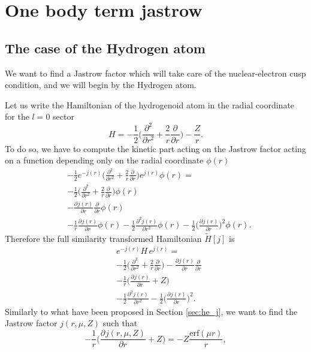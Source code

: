 \documentclass[aip,jcp,reprint,noshowkeys,superscriptaddress]{revtex4-1}
\newcommand{\deriv}[3]{\frac{\partial^{#3} #1}{\partial {#2}^{#3}}}
\begin{document}
\section{One body term jastrow}
\subsection{The case of the Hydrogen atom}
We want to find a Jastrow factor which will take care of the nuclear-electron cusp condition, and we will begin by the Hydrogen atom.  

Let us write the Hamiltonian of the hydrogenoid atom in the radial coordinate for the $l=0$ sector 
\begin{equation}
 H = -\frac{1}{2} \big( \deriv{}{r}{2} + \frac{2}{r} \deriv{}{r}{}\big) - \frac{Z}{r}.
\end{equation}
To do so, we have to compute the kinetic part acting on the Jastrow factor acting on a function depending only on the radial coordinate $\phi( r)$
\begin{equation}
 \label{eq:h_atom_j}
 \begin{aligned}
 & -\frac{1}{2}e^{-j(r)}\big(\deriv{}{r}{2} + \frac{2}{r} \deriv{}{r}{} \big) e^{j(r)}\phi(r)  = \\
 & -\frac{1}{2}\big( \deriv{}{r}{2} + \frac{2}{r} \deriv{}{r}{} \big) \phi(r) \\
 &-\deriv{j(r)}{r}{}\deriv{}{r}{}\phi(r) \\
 &-\frac{1}{r}\deriv{j(r)}{r}{}\phi(r)  - \frac{1}{2}\deriv{j(r)}{r}{2}\phi(r)  -  \frac{1}{2}\bigg(\deriv{j(r)}{r}{} \bigg)^2 \phi(r).
 \end{aligned}
\end{equation}
Therefore the full similarity transformed Hamiltonian $\tilde{H}[j]$ is 
\begin{equation}
 \begin{aligned}
 \label{eq:one_e_0}
 & e^{-j(r)}H\,e^{j(r)} = \\
 & -\frac{1}{2}\big( \deriv{}{r}{2} + \frac{2}{r} \deriv{}{r}{} \big) -\deriv{j(r)}{r}{}\deriv{}{r}{}\\
 &-\frac{1}{r}\bigg(\deriv{j(r)}{r}{} + Z \bigg) \\ 
 & - \frac{1}{2}\deriv{j(r)}{r}{2} -  \frac{1}{2}\bigg(\deriv{j(r)}{r}{} \bigg)^2.
 \end{aligned}
\end{equation}
Similarly to what have been proposed in Section \ref{sec:he_j}, we want to find the Jastrow factor $j(r,\mu,Z)$ such that 
\begin{equation}
 \label{eq:one_e_01}
 -\frac{1}{r}\bigg(\deriv{j(r,\mu,Z)}{r}{} + Z \bigg) = -Z\frac{\text{erf}(\mu r)}{r},
\end{equation}
\end{document}
